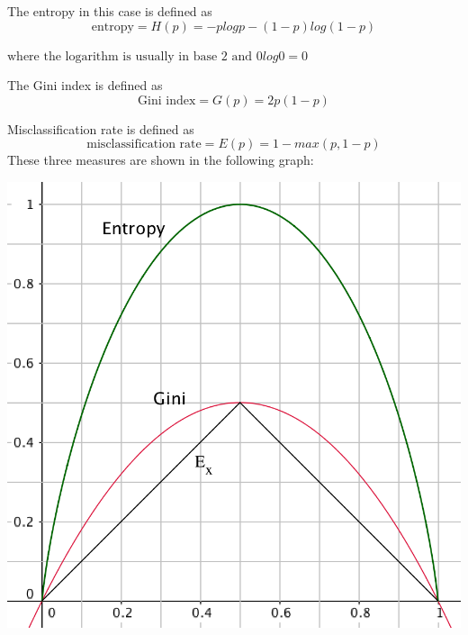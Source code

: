 \documentclass{article}
\begin{document}
The entropy in this case is defined as \[\text{entropy}=H(p)=-p\mathit{log}p-(1-p)\mathit{log}(1-p)\]
 
\(\text{where the logarithm is usually in base 2 and }  0\mathit{log}0=0\)

\medskip
The Gini index is defined as \[\text{Gini index}=G(p)=2 p(1-p)\]

Misclassification rate is defined as \[\text{misclassification rate}=E(p)=1-\mathit{max}(p,1-p)\]
These three measures are shown in the following graph:
\begin{center}
	\includegraphics[scale=0.55]{images/Gini1.png}
	
\end{center}  
\end{document}
